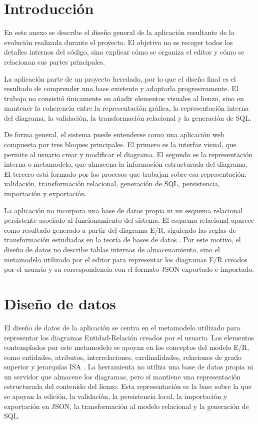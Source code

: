 
\section{Introducción}

En este anexo se describe el diseño general de la aplicación resultante de la evolución realizada durante el proyecto. El objetivo no es recoger todos los detalles internos del código, sino explicar cómo se organiza el editor y cómo se relacionan sus partes principales.

La aplicación parte de un proyecto heredado, por lo que el diseño final es el resultado de comprender una base existente y adaptarla progresivamente. El trabajo no consistió únicamente en añadir elementos visuales al lienzo, sino en mantener la coherencia entre la representación gráfica, la representación interna del diagrama, la validación, la transformación relacional y la generación de SQL.

De forma general, el sistema puede entenderse como una aplicación web compuesta por tres bloques principales. El primero es la interfaz visual, que permite al usuario crear y modificar el diagrama. El segundo es la representación interna o metamodelo, que almacena la información estructurada del diagrama. El tercero está formado por los procesos que trabajan sobre esa representación: validación, transformación relacional, generación de SQL, persistencia, importación y exportación.

La aplicación no incorpora una base de datos propia ni un esquema relacional persistente asociado al funcionamiento del sistema. El esquema relacional aparece como resultado generado a partir del diagrama E/R, siguiendo las reglas de transformación estudiadas en la teoría de bases de datos \cite{tema6}. Por este motivo, el diseño de datos no describe tablas internas de almacenamiento, sino el metamodelo utilizado por el editor para representar los diagramas E/R creados por el usuario y su correspondencia con el formato JSON exportado e importado.

\section{Diseño de datos}

El diseño de datos de la aplicación se centra en el metamodelo utilizado para representar los diagramas Entidad-Relación creados por el usuario. Los elementos contemplados por este metamodelo se apoyan en los conceptos del modelo E/R, como entidades, atributos, interrelaciones, cardinalidades, relaciones de grado superior y jerarquías ISA \cite{tema6}. La herramienta no utiliza una base de datos propia ni un servidor que almacene los diagramas, pero sí mantiene una representación estructurada del contenido del lienzo. Esta representación es la base sobre la que se apoyan la edición, la validación, la persistencia local, la importación y exportación en JSON, la transformación al modelo relacional y la generación de SQL.

